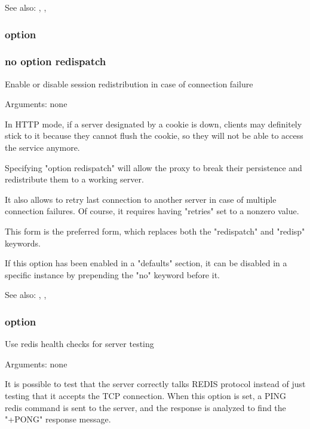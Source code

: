 {  See also: , , 

\subsubsection[redispatch]{option }
\subsubsection*{no option redispatch}


  Enable or disable session redistribution in case of connection failure


  Arguments: none

  In HTTP mode, if a server designated by a cookie is down, clients may
  definitely stick to it because they cannot flush the cookie, so they will not
  be able to access the service anymore.

  Specifying "option redispatch" will allow the proxy to break their
  persistence and redistribute them to a working server.

  It also allows to retry last connection to another server in case of multiple
  connection failures. Of course, it requires having "retries" set to a nonzero
  value.

  This form is the preferred form, which replaces both the "redispatch" and
  "redisp" keywords.

  If this option has been enabled in a "defaults" section, it can be disabled
  in a specific instance by prepending the "no" keyword before it.

  See also: , , 

\subsubsection[redis-check]{option }


  Use redis health checks for server testing


  Arguments: none

  It is possible to test that the server correctly talks REDIS protocol instead
  of just testing that it accepts the TCP connection. When this option is set,
  a PING redis command is sent to the server, and the response is analyzed to
  find the "+PONG" response message.

}

